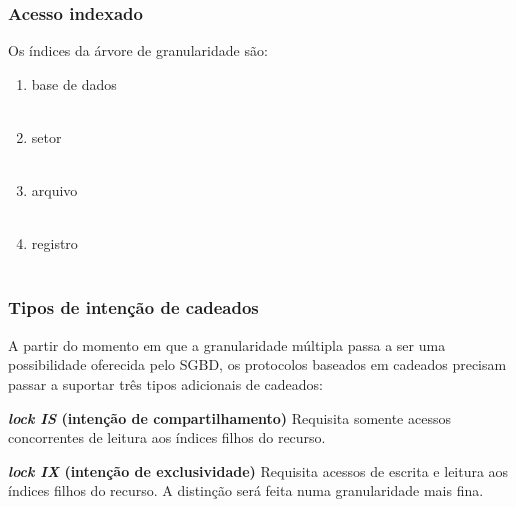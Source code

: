 \documentclass{beamer}
\begin{document}
\begin{frame} %
    \frametitle{Acesso indexado}

    Os índices da árvore de granularidade são:

    \medskip
    \begin{enumerate}
        \item base de dados \\~\\
        \item setor \\~\\
        \item arquivo \\~\\
        \item registro \\~\\
    \end{enumerate}
    
\end{frame}
    
    
\begin{frame} %
    \frametitle{Tipos de intenção de cadeados}
    
    A partir do momento em que a granularidade múltipla passa a ser uma possibilidade oferecida pelo SGBD, os protocolos baseados em cadeados precisam passar a suportar três tipos adicionais de cadeados:

    \medskip
    \begin{block}{\textbf{\emph{lock IS} (intenção de compartilhamento)}}
        Requisita somente acessos concorrentes de leitura aos índices filhos do recurso.
    \end{block}

    \medskip
    \begin{block}{\textbf{\emph{lock IX} (intenção de exclusividade)}}
        Requisita acessos de escrita e leitura aos índices filhos do recurso. A distinção será feita numa granularidade mais fina.
    \end{block}

\end{frame}
\end{document}
